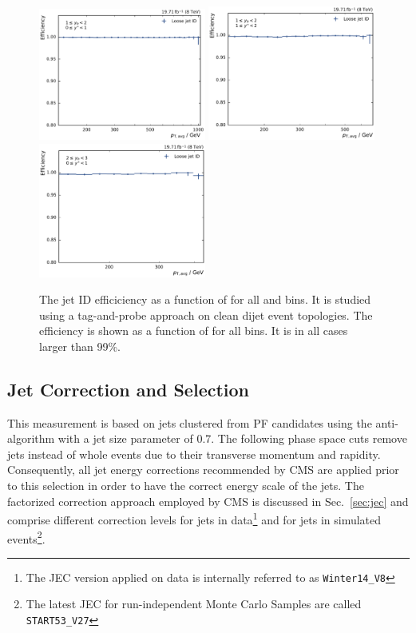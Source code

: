 \begin{figure}[htbp]
    \includegraphics[width=0.49\textwidth]{figures/measurement/jetideff_yb1ys0.pdf}
    \includegraphics[width=0.49\textwidth]{figures/measurement/jetideff_yb1ys1.pdf}\hfill
    \includegraphics[width=0.49\textwidth]{figures/measurement/jetideff_yb2ys0.pdf}
    \caption[Efficiency of the jet ID]{The jet ID efficiciency as a function of
    \ptavg for all \ystar and \yboost bins. It is studied using a
    tag-and-probe approach on clean dijet event topologies. The efficiency is
    shown as a function of \ptavg for all bins. It is in all cases larger than 99\%.}
    \label{fig:jetid_eff}
\end{figure}

\subsection{Jet Correction and Selection}

This measurement is based on jets clustered from PF candidates using the
anti-\kt algorithm with a jet size parameter of 0.7. The following phase space
cuts remove jets instead of whole events due to their transverse momentum and rapidity. Consequently,
all jet energy corrections recommended by CMS are applied prior to this
selection in order to have the correct energy scale of the jets. The factorized
correction approach employed by CMS is discussed in Sec.~\ref{sec:jec} and
comprise different correction levels for jets in data\footnote{The JEC version
 applied on data is internally referred to as \texttt{Winter14\_V8}} and for
    jets in simulated events\footnote{The latest JEC for run-independent Monte
        Carlo Samples are called \texttt{START53\_V27}}.


